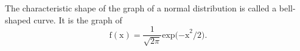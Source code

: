 The characteristic shape of the graph of a normal distribution is
called a bell-shaped curve. It is the graph of 
\[ \mathrm{f(x)=} \frac{1}{\sqrt{2 \pi}} \mathrm{exp(-x}^2 \mathrm{/2)}. \]